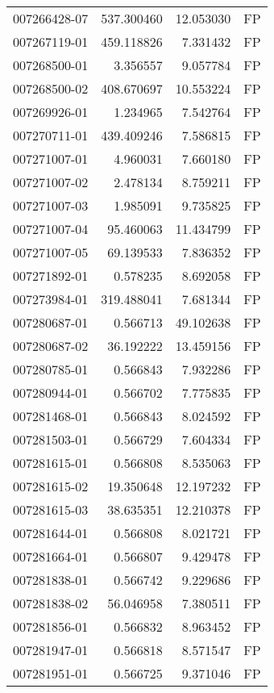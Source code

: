 \begin{tabular}{lrrl}
007266428-07 &  537.300460 &    12.053030 &   FP \\
007267119-01 &  459.118826 &     7.331432 &   FP \\
007268500-01 &    3.356557 &     9.057784 &   FP \\
007268500-02 &  408.670697 &    10.553224 &   FP \\
007269926-01 &    1.234965 &     7.542764 &   FP \\
007270711-01 &  439.409246 &     7.586815 &   FP \\
007271007-01 &    4.960031 &     7.660180 &   FP \\
007271007-02 &    2.478134 &     8.759211 &   FP \\
007271007-03 &    1.985091 &     9.735825 &   FP \\
007271007-04 &   95.460063 &    11.434799 &   FP \\
007271007-05 &   69.139533 &     7.836352 &   FP \\
007271892-01 &    0.578235 &     8.692058 &   FP \\
007273984-01 &  319.488041 &     7.681344 &   FP \\
007280687-01 &    0.566713 &    49.102638 &   FP \\
007280687-02 &   36.192222 &    13.459156 &   FP \\
007280785-01 &    0.566843 &     7.932286 &   FP \\
007280944-01 &    0.566702 &     7.775835 &   FP \\
007281468-01 &    0.566843 &     8.024592 &   FP \\
007281503-01 &    0.566729 &     7.604334 &   FP \\
007281615-01 &    0.566808 &     8.535063 &   FP \\
007281615-02 &   19.350648 &    12.197232 &   FP \\
007281615-03 &   38.635351 &    12.210378 &   FP \\
007281644-01 &    0.566808 &     8.021721 &   FP \\
007281664-01 &    0.566807 &     9.429478 &   FP \\
007281838-01 &    0.566742 &     9.229686 &   FP \\
007281838-02 &   56.046958 &     7.380511 &   FP \\
007281856-01 &    0.566832 &     8.963452 &   FP \\
007281947-01 &    0.566818 &     8.571547 &   FP \\
007281951-01 &    0.566725 &     9.371046 &   FP \\

\end{tabular}
